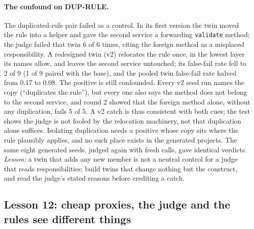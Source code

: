 \documentclass[10pt,a4paper]{article}
\begin{document}
\paragraph{The confound on DUP-RULE.}
The duplicated-rule pair failed as a control. In its first version the twin moved the rule into a helper and gave the
second service a forwarding \texttt{validate} method; the judge failed that twin 6 of 6 times, citing the foreign
method as a misplaced responsibility. A redesigned twin (v2) relocates the rule once, in the lowest layer its names
allow, and leaves the second service untouched; its false-fail rate fell to 2 of 9 (1 of 9 paired with the base),
and the pooled twin false-fail rate halved from 0.17 to 0.08. %
The positive is still confounded. Every v2 seed run names the copy (``duplicates the rule''), but every one also says
the method does not belong to the second service, and round 2 showed that the foreign method alone, without
any duplication, fails 5 of 5. A v2 catch is thus consistent with both cues; the test shows the judge is not fooled by
the relocation machinery, not that duplication alone suffices. Isolating duplication needs a positive whose copy
sits where the rule plausibly applies, and no such place exists in the generated projects. %
The same eight generated seeds, judged again with fresh calls, gave identical verdicts. %
\emph{Lesson:} a twin that adds any new member is not a neutral control for a judge that reads responsibilities; build
twins that change nothing but the construct, and read the judge's stated reasons before crediting a catch.

\subsection{Lesson 12: cheap proxies, the judge and the rules see different things}\label{sec:l12}
\end{document}
